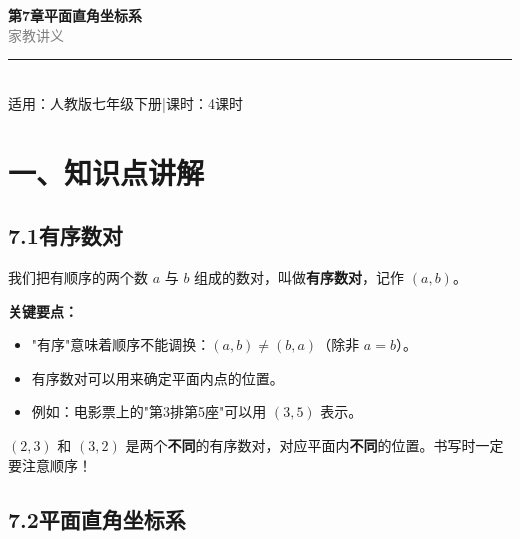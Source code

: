 \documentclass[12pt, a4paper]{ctexart}
\begin{document}
\begin{center}
{\Huge\bfseries\textcolor{mainblue}{第7章\quad 平面直角坐标系}}\\[12pt]
{\Large\textcolor{gray}{家\quad 教\quad 讲\quad 义}}\\[8pt]
\rule{0.6\textwidth}{1pt}\\[8pt]
{\normalsize 适用：人教版\quad 七年级下册\quad |\quad 课时：4课时}
\end{center}
\vspace{10pt}

\section*{\textcolor{mainblue}{一、知识点讲解}}

\subsection*{7.1\quad 有序数对}

\begin{knowledgebox}[有序数对的概念]
我们把有顺序的两个数 $a$ 与 $b$ 组成的数对，叫做\textbf{有序数对}，记作 $(a, b)$。

\medskip
\textbf{关键要点：}
\begin{itemize}[leftmargin=1.5em]
  \item "有序"意味着顺序不能调换：$(a, b) \neq (b, a)$（除非 $a = b$）。
  \item 有序数对可以用来确定平面内点的位置。
  \item 例如：电影票上的"第3排第5座"可以用 $(3, 5)$ 表示。
\end{itemize}
\end{knowledgebox}

\begin{warnbox}[易错提醒]
$(2, 3)$ 和 $(3, 2)$ 是两个\textbf{不同}的有序数对，对应平面内\textbf{不同}的位置。书写时一定要注意顺序！
\end{warnbox}

\subsection*{7.2\quad 平面直角坐标系}
\end{document}
